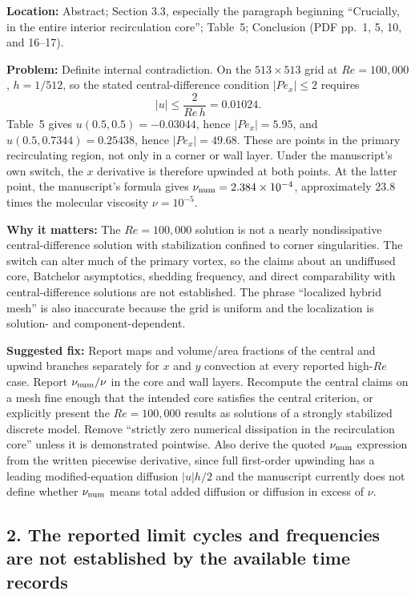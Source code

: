 \documentclass[11pt]{article}
\newcommand{\location}[1]{\textbf{Location:} #1\par}
\newcommand{\problem}[1]{\textbf{Problem:} #1\par}
\newcommand{\impact}[1]{\textbf{Why it matters:} #1\par}
\newcommand{\fixit}[1]{\textbf{Suggested fix:} #1\par}
\begin{document}
\location{Abstract; Section 3.3, especially the paragraph beginning ``Crucially, in the entire interior recirculation core''; Table~5; Conclusion (PDF pp.~1, 5, 10, and 16--17).}
\problem{Definite internal contradiction.  On the $513\times513$ grid at $Re=100{,}000$, $h=1/512$, so the stated central-difference condition $|Pe_x|\leq2$ requires
\[
 |u|\leq \frac{2}{Re\,h}=0.01024.
\]
Table~5 gives $u(0.5,0.5)=-0.03044$, hence $|Pe_x|=5.95$, and $u(0.5,0.7344)=0.25438$, hence $|Pe_x|=49.68$.  These are points in the primary recirculating region, not only in a corner or wall layer.  Under the manuscript's own switch, the $x$ derivative is therefore upwinded at both points.  At the latter point, the manuscript's formula gives $\nu_{\rm num}=2.384\times10^{-4}$, approximately $23.8$ times the molecular viscosity $\nu=10^{-5}$.}
\impact{The $Re=100{,}000$ solution is not a nearly nondissipative central-difference solution with stabilization confined to corner singularities.  The switch can alter much of the primary vortex, so the claims about an undiffused core, Batchelor asymptotics, shedding frequency, and direct comparability with central-difference solutions are not established.  The phrase ``localized hybrid mesh'' is also inaccurate because the grid is uniform and the localization is solution- and component-dependent.}
\fixit{Report maps and volume/area fractions of the central and upwind branches separately for $x$ and $y$ convection at every reported high-$Re$ case.  Report $\nu_{\rm num}/\nu$ in the core and wall layers.  Recompute the central claims on a mesh fine enough that the intended core satisfies the central criterion, or explicitly present the $Re=100{,}000$ results as solutions of a strongly stabilized discrete model.  Remove ``strictly zero numerical dissipation in the recirculation core'' unless it is demonstrated pointwise.  Also derive the quoted $\nu_{\rm num}$ expression from the written piecewise derivative, since full first-order upwinding has a leading modified-equation diffusion $|u|h/2$ and the manuscript currently does not define whether $\nu_{\rm num}$ means total added diffusion or diffusion in excess of $\nu$.}

\subsection*{2. The reported limit cycles and frequencies are not established by the available time records}
\end{document}
